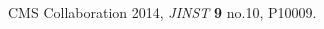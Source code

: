 \documentclass[a4paper]{jpconf}
\begin{document}
\begin{thebibliography}{9}
\item CMS Collaboration 2014, {\it JINST} \textbf{9} no.10, P10009.


\end{thebibliography}
\end{document}
